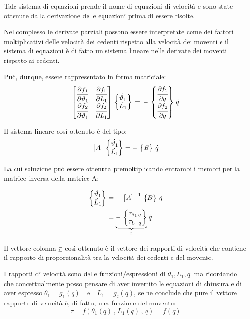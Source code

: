 		Tale sistema di equazioni prende il nome di equazioni di velocità e sono state ottenute dalla derivazione delle equazioni prima di essere risolte.
		
		Nel complesso le derivate parziali possono essere interpretate come dei fattori moltiplicativi delle velocità dei cedenti rispetto alla velocità dei moventi e il sistema di equazioni è di fatto un sistema lineare nelle derivate dei moventi rispetto ai cedenti.
		
		 Può, dunque, essere rappresentato in forma matriciale:
		\[
		\begin{bmatrix}\cfrac{\partial f_1}{\partial\vartheta_1} & \cfrac{\partial f_1}{\partial L_1}\\\cfrac{\partial f_2}{\partial\vartheta_1} & \cfrac{\partial f_2}{\partial L_1}\end{bmatrix} \,
		\begin{Bmatrix}\dot{\vartheta_1}\\\dot{L_1}\end{Bmatrix}\,
		=\,-\, \begin{Bmatrix}\cfrac{\partial f_1}{\partial q}\\\cfrac{\partial f_2}{\partial q}\end{Bmatrix}\,\dot{q}
		\]
	
	Il sistema lineare così ottenuto è del tipo:
	\begin{equation*}
	\begin{bmatrix}A\end{bmatrix}\,\begin{Bmatrix}\dot{\vartheta_1}\\\dot{L_1}\end{Bmatrix} = -\,\begin{Bmatrix}B\end{Bmatrix}\,\dot{q}
	\end{equation*}
	
	La cui soluzione può essere ottenuta premoltiplicando entrambi i membri per la matrice inversa della matrice A:
	
	\begin{align*}
		\begin{Bmatrix}\dot{\vartheta_1}\\\dot{L_1}\end{Bmatrix} &= -\,\begin{bmatrix}A\end{bmatrix}^{-1}\,\begin{Bmatrix}B\end{Bmatrix}\,\dot{q}\\
		&= \underbrace{-\,\begin{Bmatrix}\tau_{\vartheta_1\,q}\\\tau_{L_1\,q}\end{Bmatrix}}_{\underline{\tau}}\, \dot{q}
	\end{align*}
	
	Il vettore colonna $\underline{\tau}$ così ottenuto è il vettore dei rapporti di velocità che contiene il rapporto di proporzionalità tra la velocità dei cedenti e del movente.
	
	I rapporti di velocità sono delle funzioni/espressioni di $\theta_1, L_1, q$, ma ricordando che concettualmente posso pensare di aver invertito le equazioni di chiusura e di aver espresso $\theta_1 = g_1(q)\quad\text{e}\quad L_1 = g_2(q)$, se ne conclude che pure il vettore rapporto di velocità è, di fatto, una funzione del movente:
	\[
	\tau = f(\theta_1(q)\,,\,L_1(q)\,,\,q) = f(q)
	\]
	
